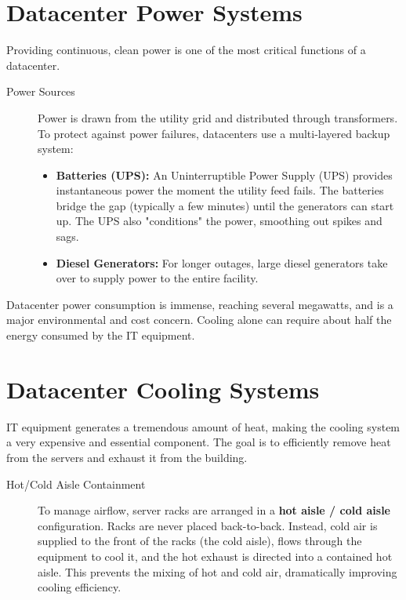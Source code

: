 \section{Datacenter Power Systems}
Providing continuous, clean power is one of the most critical functions of a datacenter.
\begin{description}
    \item[Power Sources] Power is drawn from the utility grid and distributed through transformers. To protect against power failures, datacenters use a multi-layered backup system:
    \begin{itemize}
        \item \textbf{Batteries (UPS):} An Uninterruptible Power Supply (UPS) provides instantaneous power the moment the utility feed fails. The batteries bridge the gap (typically a few minutes) until the generators can start up. The UPS also "conditions" the power, smoothing out spikes and sags.
        \item \textbf{Diesel Generators:} For longer outages, large diesel generators take over to supply power to the entire facility.
    \end{itemize}
\end{description}
Datacenter power consumption is immense, reaching several megawatts, and is a major environmental and cost concern. Cooling alone can require about half the energy consumed by the IT equipment.

\section{Datacenter Cooling Systems}
IT equipment generates a tremendous amount of heat, making the cooling system a very expensive and essential component. The goal is to efficiently remove heat from the servers and exhaust it from the building.
\begin{description}
    \item[Hot/Cold Aisle Containment] To manage airflow, server racks are arranged in a \textbf{hot aisle / cold aisle} configuration. Racks are never placed back-to-back. Instead, cold air is supplied to the front of the racks (the cold aisle), flows through the equipment to cool it, and the hot exhaust is directed into a contained hot aisle. This prevents the mixing of hot and cold air, dramatically improving cooling efficiency.
\end{description}

